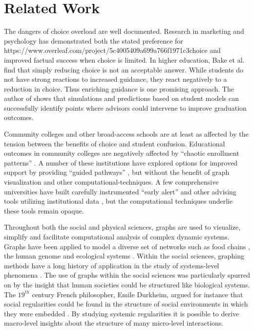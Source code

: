 \documentclass{sigchi}
\begin{document}



\section{Related Work}


The dangers of choice overload are well documented. Research in marketing \cite{botti2006} and psychology \cite{schwartz2004paradox,iyengar2000} has demonstrated both the stated preference for
https://www.overleaf.com/project/5c4005409a699a766f1971c3choice and improved factual success when choice is limited. In higher education, Bake et al. \cite{bake2018} find that simply reducing choice is not an acceptable answer. While students do not have strong reactions to increased guidance, they react negatively to a reduction in choice. Thus enriching guidance is one promising
approach. The author of \cite{slim2016} shows that simulations and
predictions based on student models can successfully identify points
where advisors could intervene to improve graduation outcomes.

Community colleges and other broad-access schools are at least as affected by the tension between the benefits of choice and student confusion. Educational
outcomes in community colleges are negatively affected by ``chaotic
enrollment patterns'' \cite{crosta2014, bail2015, scot2015}. A number of these institutions have explored options for improved support by providing ``guided pathways'' \cite{jenkins2013}, but without the benefit of graph visualization and other computational-techniques. A few comprehensive universities have built carefully instrumented ``early alert'' and other advising tools utilizing institutional data \cite{fletcher2016integrated}, but the computational techniques underlie these tools remain opaque. 

Throughout both the social and physical sciences, graphs are used to visualize, simplify and facilitate computational analysis of complex dynamic systems. Graphs have been applied to model a diverse set of networks such as food chains \cite{Hall1993}, the human genome \cite{Pevzner1989} and ecological systems \cite{Fortin2012}. Within the social sciences, graphing methods have a long history of application in the study of systems-level phenomena \cite{Borgatti2009}. The use of graphs within the social sciences was particularly spurred on by the insight that human societies could be structured like biological systems. The $19^{th}$ century French philosopher, Emile Durkheim, argued for instance that social regularities could be found in the structure of social environments in which they were embedded \cite{Durkheim1951}. By studying systemic regularities it is possible to derive macro-level insights about the structure of many micro-level interactions. 
\end{document}
